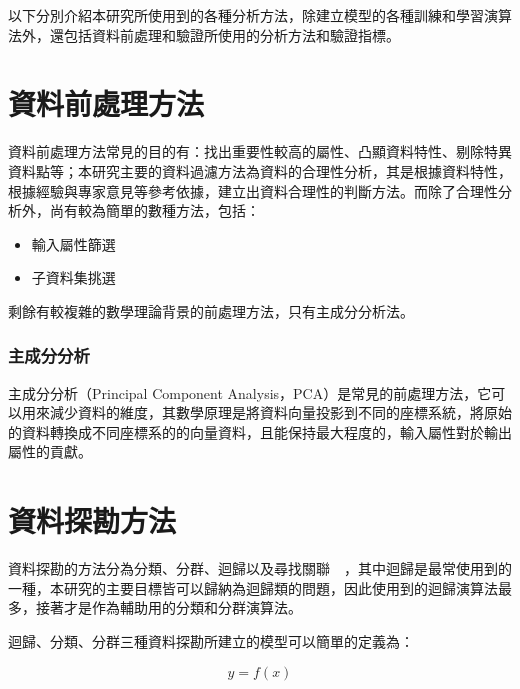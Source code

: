 以下分別介紹本研究所使用到的各種分析方法，除建立模型的各種訓練和學習演算法外，還包括資料前處理和驗證所使用的分析方法和驗證指標。


\section{資料前處理方法}

資料前處理方法常見的目的有：找出重要性較高的屬性、凸顯資料特性、剔除特異資料點等；本研究主要的資料過濾方法為資料的合理性分析，其是根據資料特性，根據經驗與專家意見等參考依據，建立出資料合理性的判斷方法。而除了合理性分析外，尚有較為簡單的數種方法，包括：

\begin{itemize}
\item 輸入屬性篩選
\item 子資料集挑選
\end{itemize}

剩餘有較複雜的數學理論背景的前處理方法，只有主成分分析法。

\subsubsection{主成分分析}

主成分分析（Principal Component Analysis，PCA）是常見的前處理方法，它可以用來減少資料的維度，其數學原理是將資料向量投影到不同的座標系統，將原始的資料轉換成不同座標系的的向量資料，且能保持最大程度的，輸入屬性對於輸出屬性的貢獻。


\section{資料探勘方法}

資料探勘的方法分為分類、分群、迴歸以及尋找關聯~\cite{fayyad1996data}~，其中迴歸是最常使用到的一種，本研究的主要目標皆可以歸納為迴歸類的問題，因此使用到的迴歸演算法最多，接著才是作為輔助用的分類和分群演算法。

迴歸、分類、分群三種資料探勘所建立的模型可以簡單的定義為：

\begin{equation} y = f(x) \label{eq:ModelEqu}\end{equation} 

